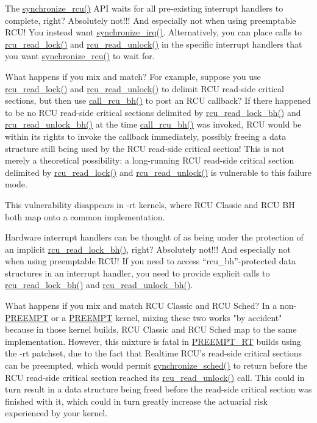 \QuickQ{}
	The \url{synchronize_rcu()} API waits for all pre-existing
	interrupt handlers to complete, right?
\QuickA{}
	Absolutely not!!!
	And especially not when using preemptable RCU!
	You instead want \url{synchronize_irq()}.
	Alternatively, you can place calls to \url{rcu_read_lock()}
	and \url{rcu_read_unlock()} in the specific interrupt handlers that
	you want \url{synchronize_rcu()} to wait for.

\QuickQ{}
	What happens if you mix and match?
	For example, suppose you use \url{rcu_read_lock()} and
	\url{rcu_read_unlock()} to delimit RCU read-side critical
	sections, but then use \url{call_rcu_bh()} to post an
	RCU callback?
\QuickA{}
	If there happened to be no RCU read-side critical
	sections delimited by \url{rcu_read_lock_bh()} and
	\url{rcu_read_unlock_bh()} at the time \url{call_rcu_bh()}
	was invoked, RCU would be within its rights to invoke the callback
	immediately, possibly freeing a data structure still being used by
	the RCU read-side critical section!
	This is not merely a theoretical possibility: a long-running RCU
	read-side critical section delimited by \url{rcu_read_lock()}
	and \url{rcu_read_unlock()} is vulnerable to this failure mode.

	This vulnerability disappears in -rt kernels, where
	RCU Classic and RCU BH both map onto a common implementation.

\QuickQ{}
	Hardware interrupt handlers can be thought of as being
	under the protection of an implicit \url{rcu_read_lock_bh()},
	right?
\QuickA{}
	Absolutely not!!!
	And especially not when using preemptable RCU!
	If you need to access ``rcu\_bh''-protected data structures
	in an interrupt handler, you need to provide explicit calls to
	\url{rcu_read_lock_bh()} and \url{rcu_read_unlock_bh()}.

\QuickQ{}
	What happens if you mix and match RCU Classic and RCU Sched?
\QuickA{}
	In a non-\url{PREEMPT} or a \url{PREEMPT} kernel, mixing these
	two works "by accident" because in those kernel builds, RCU Classic
	and RCU Sched map to the same implementation.
	However, this mixture is fatal in \url{PREEMPT_RT} builds using the -rt
	patchset, due to the fact that Realtime RCU's read-side critical
	sections can be preempted, which would permit
	\url{synchronize_sched()} to return before the
	RCU read-side critical section reached its \url{rcu_read_unlock()}
	call.
	This could in turn result in a data structure being freed before the
	read-side critical section was finished with it,
	which could in turn greatly increase the actuarial risk experienced
	by your kernel.

